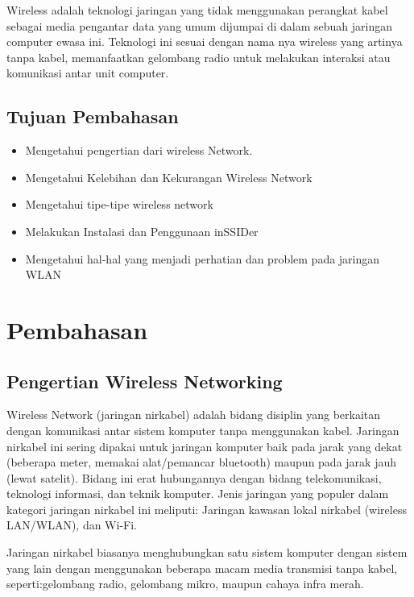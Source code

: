 \documentclass[conference]{IEEEtran}
\begin{document}
Wireless adalah teknologi jaringan yang tidak menggunakan perangkat kabel sebagai media pengantar data yang umum dijumpai di dalam sebuah jaringan computer ewasa ini. Teknologi ini sesuai dengan nama nya wireless yang artinya tanpa kabel, memanfaatkan gelombang radio untuk melakukan interaksi atau komunikasi antar unit computer.
\subsection{Tujuan Pembahasan}
\begin{itemize}
    \item Mengetahui pengertian dari wireless Network.
    \item Mengetahui Kelebihan dan Kekurangan Wireless Network
    \item Mengetahui tipe-tipe wireless network
    \item Melakukan Instalasi dan Penggunaan inSSIDer
    \item Mengetahui hal-hal yang menjadi perhatian dan problem pada jaringan WLAN
    
\end{itemize}

\section{Pembahasan}

\subsection{Pengertian Wireless Networking}
Wireless Network (jaringan nirkabel) adalah bidang disiplin yang berkaitan dengan komunikasi antar sistem komputer tanpa menggunakan kabel. Jaringan nirkabel ini sering dipakai untuk jaringan komputer baik pada jarak yang dekat (beberapa meter, memakai alat/pemancar bluetooth) maupun pada jarak jauh (lewat satelit). Bidang ini erat hubungannya dengan bidang telekomunikasi, teknologi informasi, dan teknik komputer. Jenis jaringan yang populer dalam kategori jaringan nirkabel ini meliputi: Jaringan kawasan lokal nirkabel (wireless LAN/WLAN), dan Wi-Fi.

Jaringan nirkabel biasanya menghubungkan satu sistem komputer dengan sistem yang lain dengan menggunakan beberapa macam media transmisi tanpa kabel, seperti:gelombang radio, gelombang mikro, maupun cahaya infra merah.
\end{document}
